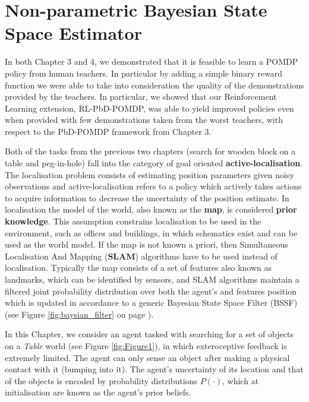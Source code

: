 \chapter{Non-parametric Bayesian State Space Estimator}

In both Chapter 3 and 4, we demonstrated that it is feasible to learn a POMDP policy from human teachers. In particular
by adding a simple binary reward function we were able to take into consideration the quality of the demonstrations 
provided by the teachers. In particular, we showed that our Reinforcement Learning extension, RL-PbD-POMDP, was able to 
yield improved policies even when provided with few demonstrations taken from the worst teachers, with respect to the 
PbD-POMDP framework from Chapter 3.

Both of the tasks from the previous two chapters (search for wooden block on a table and peg-in-hole) fall into 
the category of goal oriented \textbf{active-localisation}. The localisation problem consists of estimating 
position parameters given noisy observations and active-localisation refers to a policy which actively takes actions to 
acquire information to decrease the uncertainty of the position estimate. In localisation the model 
of the world, also known as the \textbf{map}, is considered \textbf{prior knowledge}. This assumption constrains localisation 
to be used in the environment, such as offices and buildings, in which schematics exist and can be used 
as the world model. If the map is not known a priori, then Simultaneous Localisation And Mapping (\textbf{SLAM}) algorithms have to be used instead
of localisation. Typically the map consists of a set of features also known as landmarks, which can be identified by sensors, 
and SLAM algorithms maintain a filtered joint probability distribution over both the agent's and features position which is updated in accordance to a generic 
Bayesian State Space Filter (BSSF) (see Figure \ref{fig:baysian_filter} on page \pageref{fig:baysian_filter}).

In this Chapter, we consider an agent tasked with searching for a set of objects on a \textit{Table} world (see Figure \ref{fig:Figure1}), 
in which exteroceptive feedback is extremely limited. The agent can only sense an object after making a physical 
contact with it (bumping into it). The agent's uncertainty of its location and that of the objects is encoded by probability distributions $P(\cdot)$, which 
at initialisation are known as the agent's prior beliefs.

